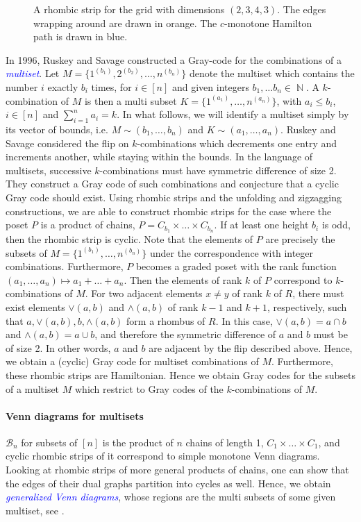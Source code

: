 \documentclass[fontsize=11pt,a4paper,DIV=12]{scrartcl}
\newcommand{\defn}[1]{\textsl{\textcolor{Blue}{#1}}}
\DeclareMathOperator{\N}{\mathbb{N}}
\begin{document}
\begin{figure}[ht]
    \centering
    \makebox[\textwidth][c]{}
    \caption{A rhombic strip for the grid with dimensions $(2,3,4,3)$. The edges wrapping around are drawn in orange. The $c$-monotone Hamilton path is drawn in blue.}
    \label{fig:multiset small}
\end{figure}
In 1996, Ruskey and Savage \cite{Combinations_multi_set} constructed a Gray-code for the combinations of a \defn{multiset}. Let $M=\{1^{(b_1)},2^{(b_2)},\ldots,n^{(b_n)}\}$ denote the multiset which contains the number $i$ exactly $b_i$ times, for $i\in[n]$ and given integers $b_1,\ldots b_n\in\N$. A $k$-combination of $M$ is then a multi subset $K=\{1^{(a_1)},\ldots,n^{(a_n)}\}$, with $a_i\le b_i$, $i\in[n]$ and $\sum_{i=1}^na_i=k$. In what follows, we will identify a multiset simply by its vector of bounds, i.e. $M\sim (b_1,\ldots,b_n)$ and $K\sim (a_1,\ldots, a_n)$. Ruskey and Savage considered the flip on $k$-combinations which decrements one entry and increments another, while staying within the bounds. In the language of multisets, successive $k$-combinations must have symmetric difference of size 2. 
They construct a Gray code of such combinations and conjecture that a cyclic Gray code should exist. Using rhombic strips and the unfolding and zigzagging constructions, we are able to construct rhombic strips for the case where the poset $P$ is a product of chains, $P=C_{b_1}\times\ldots\times C_{b_n}$. If at least one height $b_i$ is odd, then the rhombic strip is cyclic. Note that the elements of $P$ are precisely the subsets of $M=\{1^{(b_1)},\ldots,n^{(b_n)}\}$ under the correspondence with integer combinations. Furthermore, $P$ becomes a graded poset with the rank function $(a_1,\ldots,a_n)\mapsto a_1+\ldots+a_n$. Then the elements of rank $k$ of $P$ correspond to $k$-combinations of $M$. For two adjacent elements $x\ne y$ of rank $k$ of $R$, there must exist elements $\lor(a,b)$ and $\land(a,b)$ of rank $k-1$ and $k+1$, respectively, such that $a,\lor(a,b),b,\land(a,b)$ form a rhombus of $R$. In this case, $\lor(a,b)=a\cap b$ and $\land(a,b)= a\cup b$, and therefore the symmetric difference of $a$ and $b$ must be of size 2. In other words, $a$ and $b$ are adjacent by the flip described above. Hence, we obtain a (cyclic) Gray code for multiset combinations of $M$. Furthermore, these rhombic strips are Hamiltonian. Hence we obtain Gray codes for the subsets of a multiset $M$ which restrict to Gray codes of the $k$-combinations of $M$. 

\paragraph{Venn diagrams for multisets}
$\mathcal B_n$ for subsets of $[n]$ is the product of $n$ chains of length 1, $C_1\times\ldots\times C_1$, and cyclic rhombic strips of it correspond to simple monotone Venn diagrams. Looking at rhombic strips of more general products of chains, one can show that the edges of their dual graphs partition into cycles as well. Hence, we obtain \defn{generalized Venn diagrams}, whose regions are the multi subsets of some given multiset, see .
\end{document}
